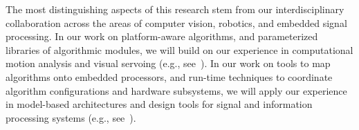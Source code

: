 The most distinguishing aspects of this research stem from our
interdisciplinary collaboration across the areas of computer vision, robotics,
and embedded signal processing.  In our work on platform-aware algorithms, and
parameterized libraries of algorithmic modules, we will build on our experience in computational motion analysis and visual servoing (e.g., see~\cite{ji2006x1,
barr2014x1, mitr2018x1}).
In our work on tools to map algorithms onto embedded processors, and run-time
techniques to coordinate algorithm configurations and hardware subsystems, we
will apply our experience in model-based architectures and design tools for
signal and information processing systems (e.g., see~\cite{bens2016x2,
bhat2019x1, bout2018x2}).



